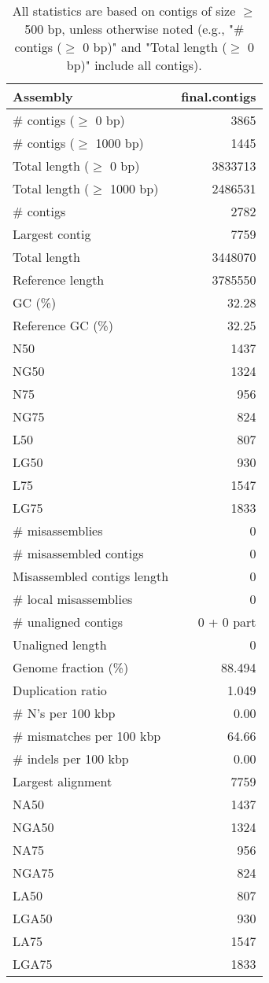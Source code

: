 \documentclass[12pt,a4paper]{article}
\begin{document}
\begin{table}[ht]
\begin{center}
\caption{All statistics are based on contigs of size $\geq$ 500 bp, unless otherwise noted (e.g., "\# contigs ($\geq$ 0 bp)" and "Total length ($\geq$ 0 bp)" include all contigs).}
\begin{tabular}{|l*{1}{|r}|}
\hline
Assembly & final.contigs \\ \hline
\# contigs ($\geq$ 0 bp) & 3865 \\ \hline
\# contigs ($\geq$ 1000 bp) & 1445 \\ \hline
Total length ($\geq$ 0 bp) & 3833713 \\ \hline
Total length ($\geq$ 1000 bp) & 2486531 \\ \hline
\# contigs & 2782 \\ \hline
Largest contig & 7759 \\ \hline
Total length & 3448070 \\ \hline
Reference length & 3785550 \\ \hline
GC (\%) & 32.28 \\ \hline
Reference GC (\%) & 32.25 \\ \hline
N50 & 1437 \\ \hline
NG50 & 1324 \\ \hline
N75 & 956 \\ \hline
NG75 & 824 \\ \hline
L50 & 807 \\ \hline
LG50 & 930 \\ \hline
L75 & 1547 \\ \hline
LG75 & 1833 \\ \hline
\# misassemblies & 0 \\ \hline
\# misassembled contigs & 0 \\ \hline
Misassembled contigs length & 0 \\ \hline
\# local misassemblies & 0 \\ \hline
\# unaligned contigs & 0 + 0 part \\ \hline
Unaligned length & 0 \\ \hline
Genome fraction (\%) & 88.494 \\ \hline
Duplication ratio & 1.049 \\ \hline
\# N's per 100 kbp & 0.00 \\ \hline
\# mismatches per 100 kbp & 64.66 \\ \hline
\# indels per 100 kbp & 0.00 \\ \hline
Largest alignment & 7759 \\ \hline
NA50 & 1437 \\ \hline
NGA50 & 1324 \\ \hline
NA75 & 956 \\ \hline
NGA75 & 824 \\ \hline
LA50 & 807 \\ \hline
LGA50 & 930 \\ \hline
LA75 & 1547 \\ \hline
LGA75 & 1833 \\ \hline
\end{tabular}
\end{center}
\end{table}
\end{document}
